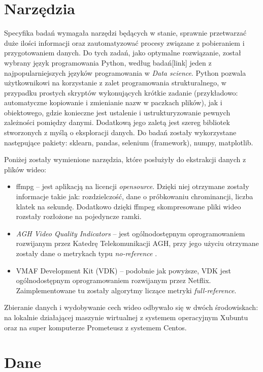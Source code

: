 \section{Narzędzia}
Specyfika badań wymagała narzędzi będących w stanie, sprawnie przetwarzać duże ilości informacji oraz zautomatyzować procesy związane z pobieraniem i przygotowaniem danych. Do tych zadań, jako optymalne rozwiązanie, został wybrany język programowania Python, według badań[link] jeden z najpopularniejszych języków programowania w {\em Data science}. Python pozwala użytkownikowi na korzystanie z zalet programowania strukturalnego, w przypadku prostych skryptów wykonujących krótkie zadanie (przykładowo: automatyczne kopiowanie i zmienianie nazw w paczkach plików), jak i obiektowego, gdzie konieczne jest ustalenie i ustrukturyzowanie pewnych zależności pomiędzy danymi. Dodatkową jego zaletą jest szereg bibliotek stworzonych z myślą o eksploracji danych. Do badań zostały wykorzystane następujące pakiety: sklearn, pandas, selenium (framework), numpy, matplotlib.\par\par
Poniżej zostały wymienione narzędzia, które posłużyły do ekstrakcji danych z plików wideo:
\begin{itemize}[label=$\bullet$]
\item ffmpg -- jest aplikacją na licencji {\em opensource}. Dzięki niej otrzymane zostały informacje takie jak: rozdzielczość, dane o próbkowaniu chrominancji, liczba klatek na sekundę. Dodatkowo dzięki ffmpeg skompresowane pliki wideo rozstały rozłożone na pojedyncze ramki.
\item {\em AGH Video Quality Indicators} -- jest ogólnodostępnym oprogramowaniem rozwijanym przez Katedrę Telekomunikacji AGH, przy jego użyciu otrzymane zostały dane o metrykach typu {\em no-reference} \cite{agh_vqm}.
\item VMAF Development Kit (VDK) -- podobnie jak powyższe, VDK jest ogólnodostępnym oprogramowaniem rozwijanym przez Netflix. Zaimplementowane tu zostały algorytmy liczące metryki {\em full-reference}\cite{vdk}.
\end{itemize}
Zbieranie danych i wydobywanie cech wideo odbywało się w dwóch środowiskach: na lokalnie działającej maszynie wirtualnej z systemem operacyjnym Xubuntu oraz na super komputerze Prometeusz z systemem Centos. 

\label{cha:drugiDokument}



\section{Dane}
\label{cha:drugiDokument}

